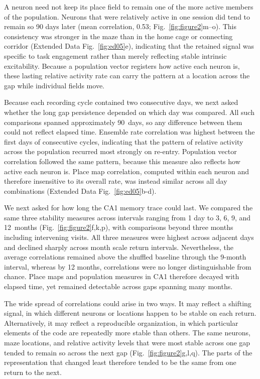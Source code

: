 \documentclass[fleqn,10pt]{wlscirep}
\begin{document}
A neuron need not keep its place field to remain one of the more active members of the population. Neurons that were relatively active in one session did tend to remain so 90 days later (mean correlation, 0.53; Fig.~\ref{fig:figure2}m–o). This consistency was stronger in the maze than in the home cage or connecting corridor (Extended Data Fig.~\ref{fig:ed05}e), indicating that the retained signal was specific to task engagement rather than merely reflecting stable intrinsic excitability. Because a population vector registers how active each neuron is, these lasting relative activity rate can carry the pattern at a location across the gap while individual fields move.

Because each recording cycle contained two consecutive days, we next asked whether the long gap persistence depended on which day was compared. All such comparisons spanned approximately 90~days, so any difference between them could not reflect elapsed time. Ensemble rate correlation was highest between the first days of consecutive cycles, indicating that the pattern of relative activity across the population recurred most strongly on re-entry. Population vector correlation followed the same pattern, because this measure also reflects how active each neuron is. Place map correlation, computed within each neuron and therefore insensitive to its overall rate, was instead similar across all day combinations (Extended Data Fig.~\ref{fig:ed05}b-d). 

We next asked for how long the CA1 memory trace could last. We compared the same three stability measures across intervals ranging from 1 day to 3, 6, 9, and 12~months (Fig.~\ref{fig:figure2}f,k,p), with comparisons beyond three months including intervening visits. All three measures were highest across adjacent days and declined sharply across month scale return intervals. Nevertheless, the average correlations remained above the shuffled baseline through the 9-month interval, whereas by 12 months, correlations were no longer distinguishable from chance. Place maps and population measures in CA1 therefore decayed with elapsed time, yet remained detectable across gaps spanning many months.

The wide spread of correlations could arise in two ways. It may reflect a shifting signal, in which different neurons or locations happen to be stable on each return. Alternatively, it may reflect a reproducible organization, in which particular elements of the code are repeatedly more stable than others. The same neurons, maze locations, and relative activity levels that were most stable across one gap tended to remain so across the next gap (Fig.~\ref{fig:figure2}g,l,q). The parts of the representation that changed least therefore tended to be the same from one return to the next.
\end{document}
